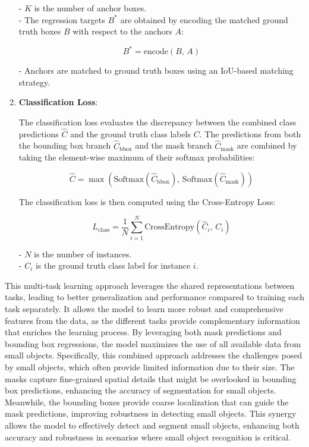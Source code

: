 \begin{enumerate}
    - \( K \) is the number of anchor boxes. \\ 
    - The regression targets \( B^* \) are obtained by encoding the matched ground truth boxes \( B \) with respect to the anchors \( A \):
    
      \[
      B^* = \text{encode}\left( B, \, A \right)
      \]
    
    - Anchors are matched to ground truth boxes using an IoU-based matching strategy.

    \item \textbf{Classification Loss}:

    The classification loss evaluates the discrepancy between the combined class predictions \( \hat{C} \) and the ground truth class labels \( C \). 
    The predictions from both the bounding box branch \( \hat{C}_{\text{bbox}} \) and the mask branch \( \hat{C}_{\text{mask}} \) are combined by 
    taking the element-wise maximum of their softmax probabilities:
    
    \[
    \hat{C} = \max\left( \text{Softmax}\left( \hat{C}_{\text{bbox}} \right), \, \text{Softmax}\left( \hat{C}_{\text{mask}} \right) \right)
    \]
    
    The classification loss is then computed using the Cross-Entropy Loss:
    
    \[
    L_{\text{class}} = \frac{1}{N} \sum_{i=1}^{N} \text{CrossEntropy}\left( \hat{C}_i, \, C_i \right)
    \]
    
    - \( N \) is the number of instances. \\
    - \( C_i \) is the ground truth class label for instance \( i \).

\end{enumerate}


This multi-task learning approach leverages the shared representations between tasks, leading to better generalization and performance compared to training each 
task separately. It allows the model to learn more robust and comprehensive features from the data, as the different tasks provide complementary information that 
enriches the learning process. By leveraging both mask predictions and bounding box regressions, the model maximizes the use of all available data from small objects. 
Specifically, this combined approach addresses the challenges posed by small objects, which often provide limited information due to their size. The masks capture 
fine-grained spatial details that might be overlooked in bounding box predictions, enhancing the accuracy of segmentation for small objects. Meanwhile, the bounding 
boxes provide coarse localization that can guide the mask predictions, improving robustness in detecting small objects. This synergy allows the model to effectively 
detect and segment small objects, enhancing both accuracy and robustness in scenarios where small object recognition is critical.

